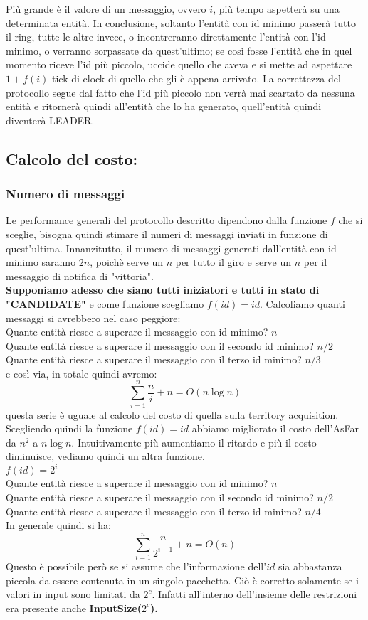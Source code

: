 Più grande è il valore di un messaggio, ovvero $i$, più tempo aspetterà su una
determinata entità. In conclusione, soltanto l'entità con id minimo passerà
tutto il ring, tutte le altre invece, o incontreranno direttamente l'entità con
l'id minimo, o verranno sorpassate da quest'ultimo; se così fosse l'entità che
in quel momento riceve l'id più piccolo, uccide quello che aveva e si mette ad
aspettare $1+f(i)$ tick di clock di quello che gli è appena arrivato. La
correttezza del protocollo segue dal fatto che l'id più piccolo non verrà mai
scartato da nessuna entità e ritornerà quindi all'entità che lo ha generato,
quell'entità quindi diventerà LEADER.

\subsection{Calcolo del costo:}
\subsubsection{Numero di messaggi}
Le performance generali del protocollo descritto dipendono dalla funzione $f$
che si sceglie, bisogna quindi stimare il numeri di messaggi inviati in funzione
di quest'ultima. Innanzitutto, il numero di messaggi generati dall'entità con id
minimo saranno $2n$, poichè serve un $n$ per tutto il giro e serve un $n$ per il
messaggio di notifica di "vittoria".\\
\textbf{Supponiamo adesso che siano tutti iniziatori e tutti in stato di
    "CANDIDATE"} e come funzione scegliamo \textbf{$f(id) = id$}. Calcoliamo quanti
messaggi si avrebbero nel caso peggiore:\\
Quante entità riesce a superare il messaggio con id minimo? $n$\\
Quante entità riesce a superare il messaggio con il secondo id minimo? $n/2$\\
Quante entità riesce a superare il messaggio con il terzo id minimo? $n/3$\\
e così via, in totale quindi avremo: $$\sum_{i=1}^{n}\frac{n}{i} + n = O(n \log
    n)$$ questa serie è uguale al calcolo del costo di quella sulla territory
acquisition. Scegliendo quindi la funzione $f(id) = id$ abbiamo migliorato il
costo dell'AsFar da $n^2$ a $n \log n$. Intuitivamente più aumentiamo il ritardo
e più il costo diminuisce, vediamo quindi un altra funzione.\\
$f(id) = 2^i$\\
Quante entità riesce a superare il messaggio con id minimo? $n$\\
Quante entità riesce a superare il messaggio con il secondo id minimo? $n/2$\\
Quante entità riesce a superare il messaggio con il terzo id minimo? $n/4$\\
In generale quindi si ha:
$$\sum_{i=1}^{n}\frac{n}{2^{i-1}}  +n = O(n)$$ Questo è possibile però se si
assume che l'informazione dell'$id$ sia abbastanza piccola da essere contenuta
in un singolo pacchetto. Ciò è corretto solamente se i valori in input sono
limitati da $2^c$. Infatti all'interno dell'insieme delle restrizioni era
presente anche \textbf{InputSize($2^c$).}\\

